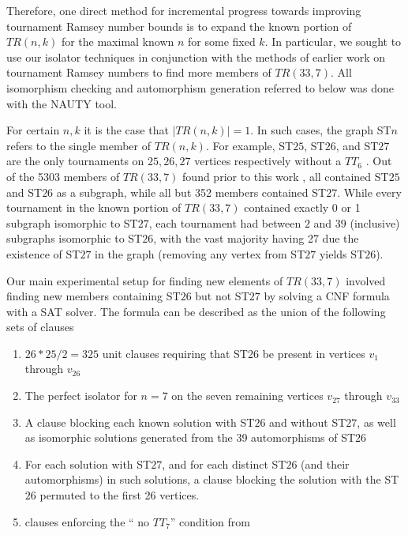 \documentclass[conference]{IEEEtran}
\begin{document}
Therefore, one direct method for incremental progress towards improving tournament Ramsey number bounds is to expand the known portion of $TR(n,k)$ for the maximal known $n$ for some fixed $k$. In particular, we sought to use our isolator techniques in conjunction with the methods of earlier work on tournament Ramsey numbers \cite{directedramsey} to find more members of $TR(33,7)$. All isomorphism checking and automorphism generation referred to below was done with the NAUTY \cite{ref_nauty} tool.

For certain $n,k$ it is the case that $|TR(n,k)| = 1$. In such cases, the graph ST$n$ refers to the single member of $TR(n,k)$. For example, ST$25$, ST$26$, and ST$27$ are the only tournaments on $25,26,27$ vertices respectively without a $TT_6$ \cite{ref_early_tournament_ramsey}. Out of the 5303 members of $TR(33,7)$ found prior to this work \cite{directedramsey}, all contained ST$25$ and ST$26$ as a subgraph, while all but 352 members contained ST$27$. While every tournament in the known portion of $TR(33,7)$ contained exactly 0 or 1 subgraph isomorphic to ST$27$, each tournament had between $2$ and $39$ (inclusive) subgraphs isomorphic to ST$26$, with the vast majority having 27 due the existence of ST$27$ in the graph (removing any vertex from ST$27$ yields ST$26$).

 Our main experimental setup for finding new elements of $TR(33,7)$ involved finding new members containing ST$26$ but not ST$27$ by solving a CNF formula with a SAT solver. The formula can be described as the union of the following sets of clauses
 
 \begin{enumerate}
 \item $26*25/2 = 325$ unit clauses requiring that ST26 be present in vertices $v_1$ through $v_{26}$
 \item The perfect isolator for $n=7$ on the seven remaining vertices $v_{27}$ through $v_{33}$
 \item A clause blocking each known solution with ST$26$ and without ST$27$, as well as isomorphic solutions generated from the 39 automorphisms of ST$26$
 \item For each solution with ST$27$, and for each distinct ST$26$ (and their automorphisms) in such solutions, a clause blocking the solution with the ST$26$ permuted to the first 26 vertices.
 \item clauses enforcing the `` no $TT_7$'' condition from \cite{directedramsey}
 \end{enumerate}
\end{document}
